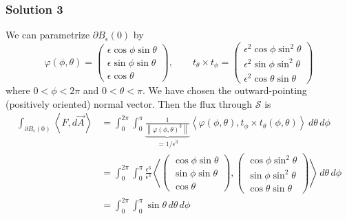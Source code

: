 \documentclass[10pt, t, allowdisplaybreaks]{beamer}
\begin{document}
\begin{frame}
    \frametitle{Solution 3}
    \par  We can parametrize $\partial B_\epsilon(0)$ by 
    \begin{equation*}
        \varphi(\phi, \theta) = \begin{pmatrix}
            \epsilon \cos \phi \sin \theta\\
            \epsilon \sin\phi \sin\theta\\
            \epsilon\cos\theta
        \end{pmatrix}, \qquad
        t_\theta\times t_\phi = \begin{pmatrix}
            \epsilon^2\cos\phi\sin^2\theta\\
            \epsilon^2\sin\phi\sin^2\theta\\
            \epsilon^2\cos\theta\sin\theta
        \end{pmatrix}
    \end{equation*}
    where $0<\phi<2\pi$ and $0<\theta<\pi$. We have chosen the outward-pointing (positively oriented) normal vector. Then the flux through $\mathcal{S}$ is 
    \begin{equation*}
        \begin{split}
            \int_{\partial B_\epsilon(0)}\left\langle F, d\overrightarrow{A} \right\rangle 
            &= \int^{2\pi}_0\int^\pi_0\underbrace{\frac{1}{\left\lVert \varphi(\phi,\theta)^3\right\rVert }}_{=1/\epsilon^3}\left\langle \varphi(\phi, \theta), t_\phi\times t_\theta(\phi, \theta)\right\rangle \,d\theta\,d\phi\\
            &= \int^{2\pi}_0\int^\pi_0 \frac{\epsilon^3}{\epsilon^3}\left\langle \begin{pmatrix}
                 \cos \phi \sin \theta\\
                 \sin\phi \sin\theta\\
                \cos\theta
            \end{pmatrix}, \begin{pmatrix}
                \cos\phi\sin^2\theta\\
                \sin\phi\sin^2\theta\\
                \cos\theta\sin\theta
            \end{pmatrix}\right\rangle \,d\theta\,d\phi\\
            &= \int^{2\pi}_0\int^\pi_0\sin\theta\,d\theta\,d\phi\\
        \end{split}
    \end{equation*}
\end{frame}
\end{document}
